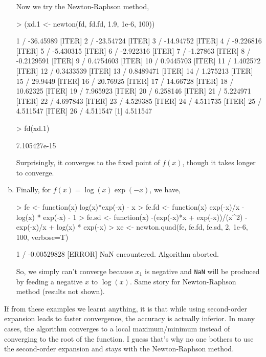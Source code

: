 \documentclass{article}
\begin{document}
\begin{enumerate}[(a)]
    Now we try the Newton-Raphson method,
\begin{Schunk}
\begin{Sinput}
> (xd.1 <- newton(fd, fd.fd, 1.9, 1e-6, 100))
\end{Sinput}
\begin{Soutput}
[ITER] 1 / -36.45989
[ITER] 2 / -23.54724
[ITER] 3 / -14.94752
[ITER] 4 / -9.226816
[ITER] 5 / -5.430315
[ITER] 6 / -2.922316
[ITER] 7 / -1.27863
[ITER] 8 / -0.2129591
[ITER] 9 / 0.4754603
[ITER] 10 / 0.9445703
[ITER] 11 / 1.402572
[ITER] 12 / 0.3433539
[ITER] 13 / 0.8489471
[ITER] 14 / 1.275213
[ITER] 15 / 29.9449
[ITER] 16 / 20.76925
[ITER] 17 / 14.66728
[ITER] 18 / 10.62325
[ITER] 19 / 7.965923
[ITER] 20 / 6.258146
[ITER] 21 / 5.224971
[ITER] 22 / 4.697843
[ITER] 23 / 4.529385
[ITER] 24 / 4.511735
[ITER] 25 / 4.511547
[ITER] 26 / 4.511547
[1] 4.511547
\end{Soutput}
\begin{Sinput}
> fd(xd.1)
\end{Sinput}
\begin{Soutput}
[1] 7.105427e-15
\end{Soutput}
\end{Schunk}
    Surprisingly, it converges to the fixed point of $f(x)$, though it takes longer to converge.

    \item Finally, for $f(x) = \log(x) \exp(-x)$, we have,
\begin{Schunk}
\begin{Sinput}
> fe <- function(x) log(x)*exp(-x) - x
> fe.fd <- function(x) exp(-x)/x - log(x) * exp(-x) - 1
> fe.sd <- function(x) -(exp(-x)*x + exp(-x))/(x^2) - exp(-x)/x + log(x) * exp(-x)
> xe <- newton.quad(fe, fe.fd, fe.sd, 2, 1e-6, 100, verbose=T)
\end{Sinput}
\begin{Soutput}
[ITER] 1 / -0.00529828
[ERROR] NaN encountered. Algorithm aborted.
\end{Soutput}
\end{Schunk}
    So, we simply can't converge because $x_1$ is negative and \verb=NaN= will be produced by feeding a negative $x$ to $\log(x)$. Same story for Newton-Raphson method (results not shown).
    \end{enumerate}

    If from these examples we learnt anything, it is that while using second-order expansion leads to faster convergence, the accuracy is actually inferior. In many cases, the algorithm converges to a local maximum/minimum instead of converging to the root of the function. I guess that's why no one bothers to use the second-order expansion and stays with the Newton-Raphson method.
\end{document}
